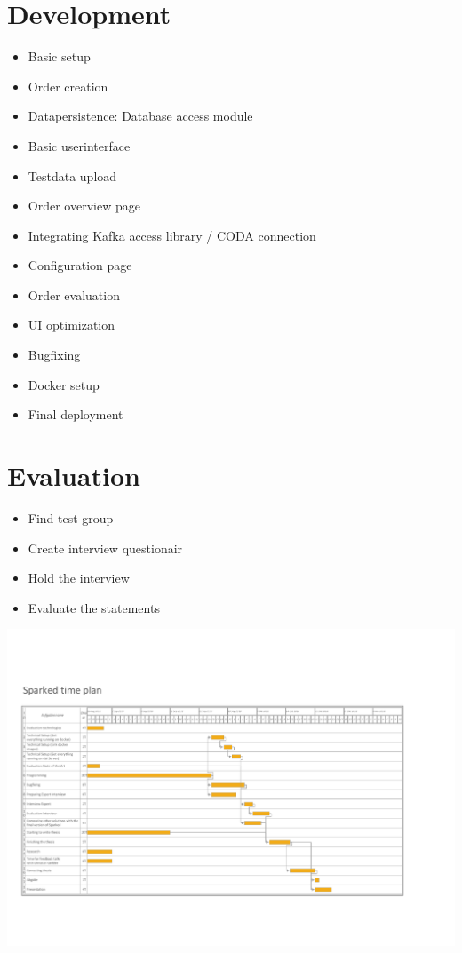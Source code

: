 \documentclass[12pt,a4paper,titlepage,oneside,BCOR1cm]{scrreprt}
\begin{document}
\section{Development}
\begin{itemize}
  \item Basic setup
  \item Order creation
  \item Datapersistence: Database access module
  \item Basic userinterface
  \item Testdata upload
  \item Order overview page
  \item Integrating Kafka access library / CODA connection
  \item Configuration page
  \item Order evaluation
  \item UI optimization  
  \item Bugfixing
  \item Docker setup
  \item Final deployment
\end{itemize}
\section{Evaluation}
  \begin{itemize}
    \item Find test group
    \item Create interview questionair
    \item Hold the interview
    \item Evaluate the statements
  \end{itemize}

\hspace*{-1.5in}
\includegraphics[width=\paperwidth]{gantt-proposal-2.pdf}
\end{document}
